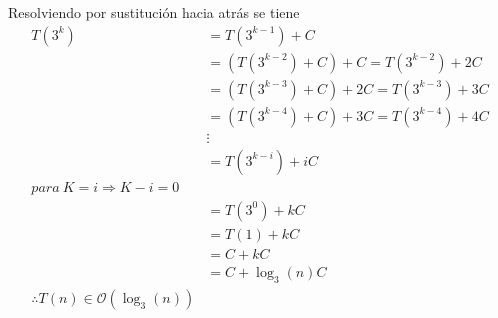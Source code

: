 \documentclass[12pt,twoside]{article}
\begin{document}
                Resolviendo por sustituci\'on hacia atr\'as se tiene\\
                \begin{align}
                    T(3^{k})&=T(3^{k-1})+C\nonumber\\
                    &=(T(3^{k-2})+C)+C=T(3^{k-2})+2C\nonumber\\
                    &=(T(3^{k-3})+C)+2C=T(3^{k-3})+3C\nonumber\\
                    &=(T(3^{k-4})+C)+3C=T(3^{k-4})+4C\nonumber\\
                    &\vdots\nonumber\\
                    &=T(3^{k-i})+iC\nonumber\\
                    para~K=i \Rightarrow K-i=0\nonumber\\
                    &=T(3^{0})+kC\nonumber\\
                    &=T(1)+kC\nonumber\\
                    &=C+kC\nonumber\\
                    &=C+\log_3{(n)}C\nonumber\\
                    \therefore T(n)\in \mathcal{O}(\log_3{(n)})\nonumber
                \end{align}
                
\end{document}
